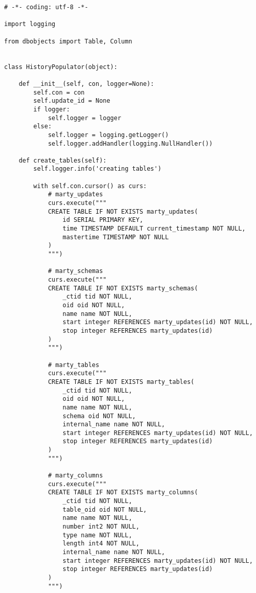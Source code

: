 \begin{lstlisting}[caption={populator.py}]
# -*- coding: utf-8 -*-

import logging

from dbobjects import Table, Column


class HistoryPopulator(object):

    def __init__(self, con, logger=None):
        self.con = con
        self.update_id = None
        if logger:
            self.logger = logger
        else:
            self.logger = logging.getLogger()
            self.logger.addHandler(logging.NullHandler())

    def create_tables(self):
        self.logger.info('creating tables')

        with self.con.cursor() as curs:
            # marty_updates
            curs.execute("""
            CREATE TABLE IF NOT EXISTS marty_updates(
                id SERIAL PRIMARY KEY,
                time TIMESTAMP DEFAULT current_timestamp NOT NULL,
                mastertime TIMESTAMP NOT NULL
            )
            """)

            # marty_schemas
            curs.execute("""
            CREATE TABLE IF NOT EXISTS marty_schemas(
                _ctid tid NOT NULL,
                oid oid NOT NULL,
                name name NOT NULL,
                start integer REFERENCES marty_updates(id) NOT NULL,
                stop integer REFERENCES marty_updates(id)
            )
            """)

            # marty_tables
            curs.execute("""
            CREATE TABLE IF NOT EXISTS marty_tables(
                _ctid tid NOT NULL,
                oid oid NOT NULL,
                name name NOT NULL,
                schema oid NOT NULL,
                internal_name name NOT NULL,
                start integer REFERENCES marty_updates(id) NOT NULL,
                stop integer REFERENCES marty_updates(id)
            )
            """)

            # marty_columns
            curs.execute("""
            CREATE TABLE IF NOT EXISTS marty_columns(
                _ctid tid NOT NULL,
                table_oid oid NOT NULL,
                name name NOT NULL,
                number int2 NOT NULL,
                type name NOT NULL,
                length int4 NOT NULL,
                internal_name name NOT NULL,
                start integer REFERENCES marty_updates(id) NOT NULL,
                stop integer REFERENCES marty_updates(id)
            )
            """)


\end{lstlisting}

